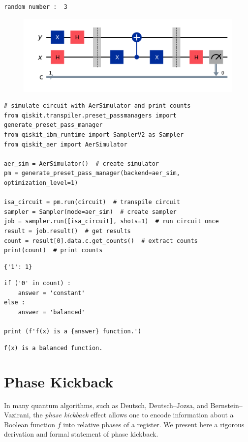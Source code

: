 \begin{lstlisting}
random number :  3
\end{lstlisting}
\begin{figure}[h!]\centering
\includegraphics[scale=.5]{images/lab03_2}
\end{figure}
\begin{lstlisting}[style=python]
# simulate circuit with AerSimulator and print counts
from qiskit.transpiler.preset_passmanagers import generate_preset_pass_manager
from qiskit_ibm_runtime import SamplerV2 as Sampler
from qiskit_aer import AerSimulator

aer_sim = AerSimulator()  # create simulator
pm = generate_preset_pass_manager(backend=aer_sim, optimization_level=1) 

isa_circuit = pm.run(circuit)  # transpile circuit
sampler = Sampler(mode=aer_sim)  # create sampler
job = sampler.run([isa_circuit], shots=1)  # run circuit once
result = job.result()  # get results
count = result[0].data.c.get_counts()  # extract counts
print(count)  # print counts
\end{lstlisting}
\begin{lstlisting}
{'1': 1}
\end{lstlisting}
\begin{lstlisting}[style=python]
if ('0' in count) :
	answer = 'constant'
else :
	answer = 'balanced'

print (f'f(x) is a {answer} function.')
\end{lstlisting}
\begin{lstlisting}
f(x) is a balanced function.
\end{lstlisting}

\newpage
\section{Phase Kickback}\label{sec:phase-kickback}

In many quantum algorithms, such as Deutsch, Deutsch--Jozsa, and Bernstein--Vazirani, the \emph{phase kickback} effect allows one to encode information about a Boolean function $f$ into relative phases of a register.  We present here a rigorous derivation and formal statement of phase kickback.


